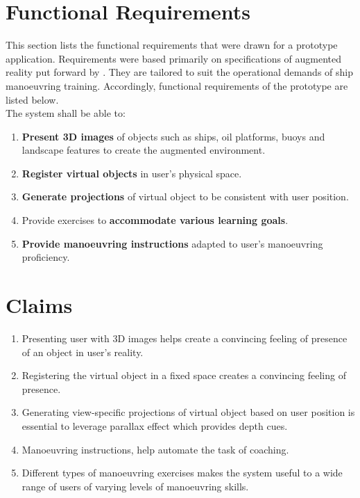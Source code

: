 \section{Functional Requirements}
\label{sec:functionalreqs}
This section lists the functional requirements that were drawn for a prototype application. Requirements were based primarily on specifications of augmented reality put forward by \cite{azuma1997survey}. They are tailored to suit the operational demands of ship manoeuvring training. Accordingly, functional requirements of the prototype are listed below.\\

The system shall be able to:
\begin{enumerate}[itemsep=0.01em]
\item \textbf{Present 3D images} of objects such as ships, oil platforms, buoys and landscape features to create the augmented environment.
\item \textbf{Register virtual objects} in user’s physical space.
\item \textbf{Generate projections} of virtual object to be consistent with user position.
\item Provide exercises to \textbf{accommodate various learning goals}. 
\item \textbf{Provide manoeuvring instructions} adapted to user's manoeuvring proficiency.
\end{enumerate}

\section{Claims}
\label{sec:claims}
\begin{enumerate}[itemsep=0.01em]
	\item Presenting user with 3D images helps create a convincing feeling of presence of an object in user’s reality. 
	\item Registering the virtual object in a fixed space creates a convincing feeling of presence.
	\item Generating view-specific projections of virtual object based on user position is essential to leverage parallax effect which provides depth cues.
	\item Manoeuvring instructions, help automate the task of coaching. 
	\item Different types of manoeuvring exercises makes the system useful to a wide range of users of varying levels of manoeuvring skills.
\end{enumerate}

